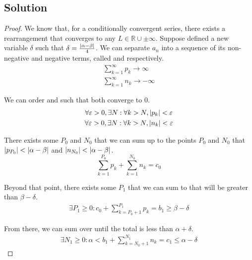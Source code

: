 \documentclass[12pt]{report}
\begin{document}
    \subsection{Solution}
        \begin{proof}
            We know that, for a conditionally convergent series, there exists a rearrangement that converges to any $L \in \mathbb{R} \cup \pm \infty$.
            Suppose defined a new variable $\delta$ such that $\delta = \frac{\left| \alpha - \beta \right|}{4}$.
            We can separate $a_n$ into a sequence of its non-negative and negative terms, called  and  respectively.
            \begin{gather}
                \sum_{k=1}^{\infty} p_k \to \infty\\
                \sum_{k=1}^{\infty} n_k \to -\infty
            \end{gather}
            
            We can order  and  such that both converge to $0$.
            \begin{gather}
                \forall \varepsilon > 0, \exists N : \forall k > N, \left| p_k \right| < \varepsilon\\
                \forall \varepsilon > 0, \exists N : \forall k > N, \left| n_k \right| < \varepsilon
            \end{gather}

            There exists some $P_0$  and $N_0$ that we can sum up to the points $P_0$ and $N_0$ that $\left| p_{P_0} \right| < \left| \alpha - \beta \right|$ and $\left| n_{N_0} \right| < \left| \alpha - \beta \right|$. 
            \begin{equation}
                \sum_{k=1}^{P_0} p_k + \sum_{k=1}^{N_0} n_k = c_0
            \end{equation}

            Beyond that point, there exists some $P_1$ that we can sum to that will be greater than $\beta - \delta$.
            \begin{gather}
                \exists P_1 \geq 0 : c_0 + \sum_{k=P_0 + 1}^{P_1} p_k = b_1 \geq \beta - \delta
            \end{gather}

            From there, we can sum over  until the total is less than $\alpha + \delta$.
            \begin{gather}
                \exists N_1 \geq 0 : \alpha < b_1 + \sum_{k=N_0 + 1}^{N_1} n_k = c_1 \leq \alpha - \delta
            \end{gather}


\end{proof}
\end{document}
